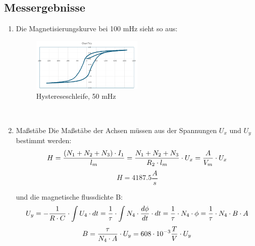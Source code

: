 \documentclass[a4paper,twoside,12pt,DIV=13,BCOR=5mm,numbers=noenddot,cleardoublepage=empty]{scrbook}
\begin{document}
    \newpage

    \subsection{Messergebnisse}

        \begin{enumerate}
            \item Die Magnetisierungskurve bei 100 mHz sieht so aus:

            \begin{figure}[h] 
            \centering
            \includegraphics[width=0.5\textwidth]{pictures/50mHz.png} 
            \caption{Hystereseschleife, 50 mHz}
            \label{fig:meinbild}
             \end{figure}

            \\
            
            \item Maßstäbe
                Die Maßstäbe der Achsen müssen aus der Spannungen $U_x$ und $U_y$ bestimmt werden:
                \begin{equation}
                    H = \frac{(N_1 + N_2 + N_3) \cdot I_1}{l_m} \\
                    = \frac{N_1 + N_2 + N_3}{R_2 \cdot l_m} \cdot U_x \\
                    = \frac{A}{V_m} \cdot U_x
                \end{equation}
                \begin{equation}
                    H = 4187.5 \frac{A}{s}
                \end{equation}

                und die magnetische flussdichte B:
                \begin{equation}
                    U_y = -\frac{1}{R \cdot C} \cdot \int U_4 \cdot dt \\
                    = \frac{1}{\tau} \cdot \int N_4 \cdot \frac{d\phi}{dt} \cdot dt \\
                    = \frac{1}{\tau} \cdot N_4 \cdot \phi \\
                    = \frac{1}{\tau} \cdot N_4 \cdot B \cdot A \\
                \end{equation}
                \begin{equation}
                    B = \frac{\tau}{N_4 \cdot A} \cdot U_y \\
                    = 608 \cdot 10^{-3} \frac{T}{V} \cdot U_y \\
                \end{equation}


\end{enumerate}
\end{document}
